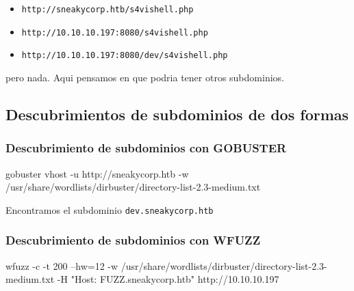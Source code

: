 \documentclass{assets/ipesethesis}
\newenvironment{Shaded}{\begin{snugshade}}{\end{snugshade}}
\newcommand{\ExtensionTok}[1]{#1}
\newcommand{\NormalTok}[1]{#1}
\newcommand{\StringTok}[1]{\textcolor[rgb]{0.31,0.60,0.02}{#1}}
\providecommand{\tightlist}{%
  \setlength{\itemsep}{0pt}\setlength{\parskip}{0pt}}
\begin{document}
\begin{itemize}
\tightlist
\item
  \texttt{http://sneakycorp.htb/s4vishell.php}
\item
  \texttt{http://10.10.10.197:8080/s4vishell.php}
\item
  \texttt{http://10.10.10.197:8080/dev/s4vishell.php}
\end{itemize}

pero nada. Aqui pensamos en que podria tener otros subdominios.

\hypertarget{descubrimientos-de-subdominios-de-dos-formas}{%
\subsection*{Descubrimientos de subdominios de dos formas}\label{descubrimientos-de-subdominios-de-dos-formas}}

\hypertarget{descubrimiento-de-subdominios-con-gobuster}{%
\subsubsection*{Descubrimiento de subdominios con GOBUSTER}\label{descubrimiento-de-subdominios-con-gobuster}}

\begin{Shaded}
\begin{Highlighting}[]
\ExtensionTok{gobuster}\NormalTok{ vhost -u http://sneakycorp.htb -w /usr/share/wordlists/dirbuster/directory-list-2.3-medium.txt}
\end{Highlighting}
\end{Shaded}

Encontramos el subdominio \texttt{dev.sneakycorp.htb}

\hypertarget{descubrimiento-de-subdominios-con-wfuzz}{%
\subsubsection*{Descubrimiento de subdominios con WFUZZ}\label{descubrimiento-de-subdominios-con-wfuzz}}

\begin{Shaded}
\begin{Highlighting}[]
\ExtensionTok{wfuzz}\NormalTok{ -c -t 200 --hw=12 -w /usr/share/wordlists/dirbuster/directory-list-2.3-medium.txt -H }\StringTok{"Host: FUZZ.sneakycorp.htb"}\NormalTok{ http://10.10.10.197}
\end{Highlighting}
\end{Shaded}
\end{document}
